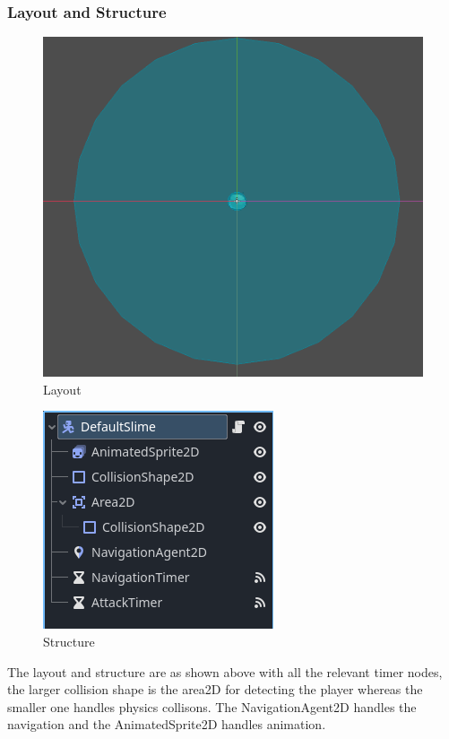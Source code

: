 \documentclass{article}
\begin{document}
        \subsubsection{Layout and Structure}
        \begin{multicols}{2}
                \begin{figure}[H]
                        \centering
                        \includegraphics[width = 0.9\columnwidth]{images/development/Enemy_layout.PNG}
                        \caption{Layout}
                \end{figure}
                \begin{figure}[H]
                        \centering
                        \includegraphics[width = 0.9\columnwidth]{images/development/Enemy_structure.PNG}
                        \caption{Structure}
                \end{figure}   
        \end{multicols}
        The layout and structure are as shown above with all the relevant timer nodes, the larger collision shape is the area2D for detecting the player whereas the smaller one handles physics collisons. The NavigationAgent2D handles the navigation and the AnimatedSprite2D handles animation.\\
\end{document}
